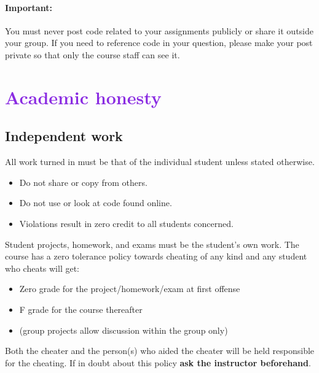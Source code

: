 \documentclass[letterpaper,11pt]{article}
\begin{document}
\paragraph{Important:} You must never post code related to your
assignments publicly or share it outside your group. If you need to
reference code in your question, please make your post private so that
only the course staff can see it.






\section*{\textcolor{BlueViolet}{Academic honesty}}

\subsection*{Independent work}
All work turned in must be that of the individual student unless stated otherwise.
\begin{itemize}
\item Do not share or copy from others.
\item Do not use or look at code found online.
\item Violations result in zero credit to all students concerned.
\end{itemize}

Student projects, homework, and exams must be the student's own
work. The course has a zero tolerance policy towards cheating of any
kind and any student who cheats will get:
\begin{itemize}
\item Zero grade for the project/homework/exam at first offense
\item F grade for the course thereafter
\item (group projects allow discussion within the group only)
\end{itemize}

Both the cheater and the person(s) who aided the cheater will be held responsible for the cheating.
If in doubt about this policy \textbf{ask the instructor beforehand}.
\end{document}
